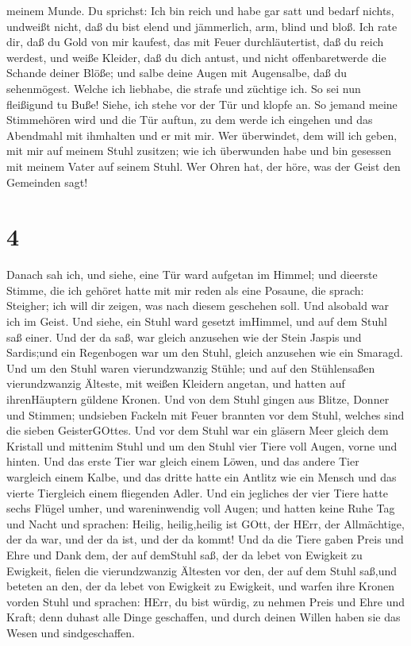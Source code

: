 meinem Munde.  Du sprichst: Ich bin reich und habe gar satt
und bedarf nichts, undweißt nicht, daß du bist elend und jämmerlich,
arm, blind und bloß.  Ich rate dir, daß du Gold von mir
kaufest, das mit Feuer durchläutertist, daß du reich werdest, und weiße
Kleider, daß du dich antust, und nicht offenbaretwerde die Schande
deiner Blöße; und salbe deine Augen mit Augensalbe, daß du sehenmögest.
 Welche ich liebhabe, die strafe und züchtige ich. So sei
nun fleißigund tu Buße!  Siehe, ich stehe vor der Tür und
klopfe an. So jemand meine Stimmehören wird und die Tür auftun, zu dem
werde ich eingehen und das Abendmahl mit ihmhalten und er mit mir.
 Wer überwindet, dem will ich geben, mit mir auf meinem
Stuhl zusitzen; wie ich überwunden habe und bin gesessen mit meinem
Vater auf seinem Stuhl.  Wer Ohren hat, der höre, was der
Geist den Gemeinden sagt!

\hypertarget{section-2}{%
\section{4}\label{section-2}}

 Danach sah ich, und siehe, eine Tür ward aufgetan im
Himmel; und dieerste Stimme, die ich gehöret hatte mit mir reden als
eine Posaune, die sprach: Steigher; ich will dir zeigen, was nach diesem
geschehen soll.  Und alsobald war ich im Geist. Und siehe,
ein Stuhl ward gesetzt imHimmel, und auf dem Stuhl saß einer.
 Und der da saß, war gleich anzusehen wie der Stein Jaspis
und Sardis;und ein Regenbogen war um den Stuhl, gleich anzusehen wie ein
Smaragd.  Und um den Stuhl waren vierundzwanzig Stühle; und
auf den Stühlensaßen vierundzwanzig Älteste, mit weißen Kleidern
angetan, und hatten auf ihrenHäuptern güldene Kronen.  Und
von dem Stuhl gingen aus Blitze, Donner und Stimmen; undsieben Fackeln
mit Feuer brannten vor dem Stuhl, welches sind die sieben GeisterGOttes.
 Und vor dem Stuhl war ein gläsern Meer gleich dem Kristall
und mittenim Stuhl und um den Stuhl vier Tiere voll Augen, vorne und
hinten.  Und das erste Tier war gleich einem Löwen, und das
andere Tier wargleich einem Kalbe, und das dritte hatte ein Antlitz wie
ein Mensch und das vierte Tiergleich einem fliegenden Adler.
 Und ein jegliches der vier Tiere hatte sechs Flügel umher,
und wareninwendig voll Augen; und hatten keine Ruhe Tag und Nacht und
sprachen: Heilig, heilig,heilig ist GOtt, der HErr, der Allmächtige, der
da war, und der da ist, und der da kommt!  Und da die Tiere
gaben Preis und Ehre und Dank dem, der auf demStuhl saß, der da lebet
von Ewigkeit zu Ewigkeit,  fielen die vierundzwanzig
Ältesten vor den, der auf dem Stuhl saß,und beteten an den, der da lebet
von Ewigkeit zu Ewigkeit, und warfen ihre Kronen vorden Stuhl und
sprachen:  HErr, du bist würdig, zu nehmen Preis und Ehre
und Kraft; denn duhast alle Dinge geschaffen, und durch deinen Willen
haben sie das Wesen und sindgeschaffen.

